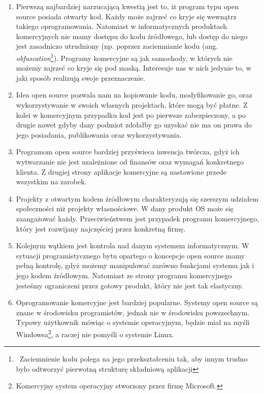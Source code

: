 \documentclass{article}
\begin{document}
\begin{enumerate}
    \item Pierwszą najbardziej narzucającą kwestią jest to, iż program typu open source posiada otwarty kod. Każdy może zajrzeć co kryje się wewnątrz takiego oprogramowania. Natomiast w informatycznych produktach komercyjnych nie mamy dostępu do kodu źródłowego, lub dostęp do niego jest zasadniczo utrudniony (np. poprzez zaciemnianie kodu (ang. \emph{obfuscation}\footnote{\, Zaciemnienie kodu polega na jego przekształceniu tak, aby innym trudno było odtworzyć pierwotną strukturę składniową aplikacji\cite{Kotula}}). Programy komercyjne są jak samochody, w których nie możemy zajrzeć co kryje się pod maską. Interesuje nas w nich jedynie to, w jaki sposób realizują swoje przeznaczenie.
    
    \item Idea open source pozwala nam na kopiowanie kodu, modyfikowanie go, oraz wykorzystywanie w swoich własnych projektach, które mogą być płatne. Z kolei w komercyjnym przypadku kod jest po pierwsze zabezpieczony, a po drugie nawet gdyby dany podmiot zdołałby go uzyskać nie ma on prawa do jego posiadania, publikowania oraz wykorzystywania.
    
    \item Programom open source bardziej przyświeca inwencja twórcza, gdyż ich wytwarzanie nie jest uzależnione od finansów oraz wymagań konkretnego klienta. Z drugiej strony aplikacje komercyjne są nastawione przede wszystkim na zarobek.
    
    \item Projekty z otwartym kodem źródłowym charakteryzują się szerszym udziałem społeczności niż projekty własnościowe. W dany produkt OS może się zaangażować każdy. Przeciwieństwem jest przypadek programu komercyjnego, który jest rozwijany najczęściej przez konkretną firmę. 
    
    \item Kolejnym wątkiem jest kontrola nad danym systemem informatycznym. W sytuacji programistycznego bytu opartego o koncepcje open source mamy pełną kontrolę, gdyż możemy manipulować zarówno funkcjami systemu jak i jego kodem źródłowym. Natomiast ze strony programu komercyjnego jesteśmy ograniczeni przez gotowy produkt, który nie jest tak elastyczny.
    
    \item Oprogramowanie komercyjne jest bardziej popularne. Systemy open source są znane w środowisku programistów, jednak nie w środowisku powszechnym. Typowy użytkownik mówiąc o systemie operacyjnym, będzie miał na myśli Windowsa\footnote{Komercyjny system operacyjny stworzony przez firmę Microsoft.}, a raczej nie pomyśli o systemie Linux.
    

\end{enumerate}
\end{document}
